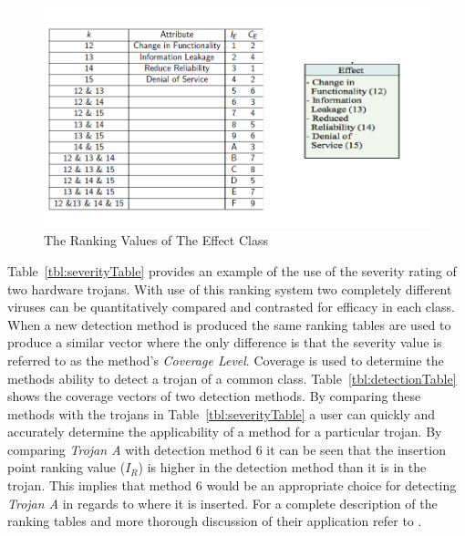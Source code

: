 \begin{figure}[h]
	\centering
	\includegraphics[width=0.8\linewidth]{figures/effectSeverity}
	\caption[The Ranking Values of The Effect Class]{The Ranking Values of The Effect Class}
	\label{fig:effectSeverity}
\end{figure}

Table~\ref{tbl:severityTable} provides an example of the use of the severity rating of two hardware trojans. With use of this ranking system two completely different viruses can be quantitatively compared and contrasted for efficacy in each class. When a new detection method is produced the same ranking tables are used to produce a similar vector where the only difference is that the severity value is referred to as the method's \textit{Coverage Level}. Coverage is used to determine the methods ability to detect a trojan of a common class. Table~\ref{tbl:detectionTable} shows the coverage vectors of two detection methods. By comparing these methods with the trojans in Table~\ref{tbl:severityTable} a user can quickly and accurately determine the applicability of a method for a particular trojan. By comparing \textit{Trojan A} with detection method $6$ it can be seen that the insertion point ranking value ($I_R$) is higher in the detection method than it is in the trojan. This implies that method $6$ would be an appropriate choice for detecting \textit{Trojan A} in regards to where it is inserted. For a complete description of the ranking tables and more thorough discussion of their application refer to \cite{SamerDetection}.\newline

